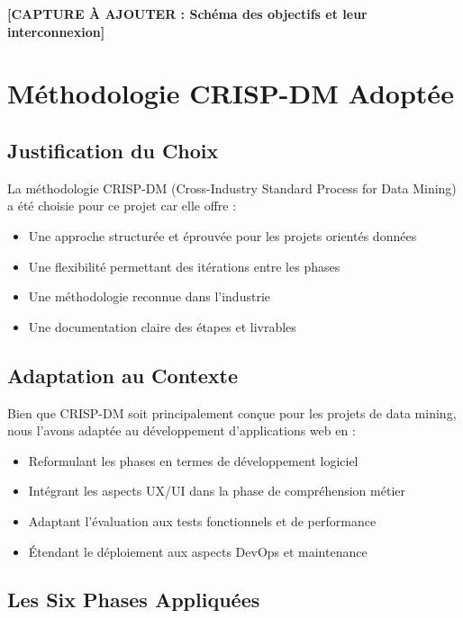\textbf{[CAPTURE À AJOUTER : Schéma des objectifs et leur interconnexion]}

\section{Méthodologie CRISP-DM Adoptée}

\subsection{Justification du Choix}

La méthodologie CRISP-DM (Cross-Industry Standard Process for Data Mining) a été choisie pour ce projet car elle offre :

\begin{itemize}
    \item Une approche structurée et éprouvée pour les projets orientés données
    \item Une flexibilité permettant des itérations entre les phases
    \item Une méthodologie reconnue dans l'industrie
    \item Une documentation claire des étapes et livrables
\end{itemize}

\subsection{Adaptation au Contexte}

Bien que CRISP-DM soit principalement conçue pour les projets de data mining, nous l'avons adaptée au développement d'applications web en :

\begin{itemize}
    \item Reformulant les phases en termes de développement logiciel
    \item Intégrant les aspects UX/UI dans la phase de compréhension métier
    \item Adaptant l'évaluation aux tests fonctionnels et de performance
    \item Étendant le déploiement aux aspects DevOps et maintenance
\end{itemize}

\subsection{Les Six Phases Appliquées}

